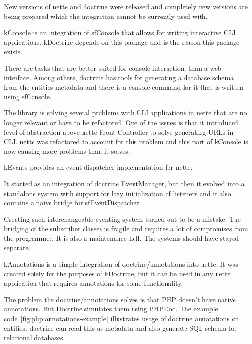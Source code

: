 New versions of \gls{nette} and \gls{doctrine} were released and completely new versions are being prepared which the integration cannot be currently used with.

 \label{sec:state:console}

\gls{kConsole} is an integration of \gls{sfConsole} that allows for writing interactive CLI applications. \gls{kDoctrine} depends on this package and is the reason this package exists.

There are tasks that are better suited for console interaction, than a web interface. Among others, \gls{doctrine} has tools for generating a database schema from the entities metadata and there is a console command for it that is written using \gls{sfConsole}.

The library is solving several problems with CLI applications in \gls{nette} that are no longer relevant or have to be refactored. One of the issues is that it introduced level of abstraction above \gls{nette} Front Controller to solve generating URLs in CLI. \gls{nette} was refactored to account for this problem and this part of \gls{kConsole} is now causing more problems than it solves.

 \label{sec:state:events}

\gls{kEvents} provides an event dispatcher implementation for \gls{nette}.

It started as an integration of \gls{doctrine} EventManager, but then it evolved into a standalone system with support for lazy initialization of listeners and it also contains a naive bridge for \gls{sfEventDispatcher}.

Creating such interchangeable eventing system turned out to be a mistake. The bridging of the subscriber classes is fragile and requires a lot of compromises from the programmer. It is also a maintenance hell. The systems should have stayed separate.

 \label{sec:state:annotations}

\gls{kAnnotations} is a simple integration of doctrine/annotations into \gls{nette}. It was created solely for the purposes of \gls{kDoctrine}, but it can be used in any \gls{nette} application that requires annotations for some functionality.

The problem the doctrine/annotations solves is that PHP doesn't have native annotations. But Doctrine simulates them using PHPDoc. The example code~\ref{fig:php:annotations-example} illustrates usage of \gls{doctrine} annotations on entities. \gls{doctrine} can read this as metadata and also generate SQL schema for relational databases.

